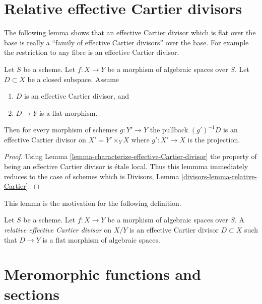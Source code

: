 








\section{Relative effective Cartier divisors}
\label{section-effective-Cartier-morphisms}

\noindent
The following lemma shows that an effective Cartier divisor which is
flat over the base is really a ``family of effective Cartier divisors''
over the base. For example the restriction to any fibre is an effective
Cartier divisor.

\begin{lemma}
\label{lemma-relative-Cartier}
Let $S$ be a scheme. Let $f : X \to Y$ be a morphism of
algebraic spaces over $S$. Let $D \subset X$ be a closed subspace.
Assume
\begin{enumerate}
\item $D$ is an effective Cartier divisor, and
\item $D \to Y$ is a flat morphism.
\end{enumerate}
Then for every morphism of schemes $g : Y' \to Y$ the pullback
$(g')^{-1}D$ is an effective Cartier divisor on $X' = Y' \times_Y X$
where $g' : X' \to X$ is the projection.
\end{lemma}

\begin{proof}
Using Lemma \ref{lemma-characterize-effective-Cartier-divisor}
the property of being an effective Cartier divisor is \'etale local.
Thus this lemmma immediately reduces to the case of schemes
which is Divisors, Lemma \ref{divisors-lemma-relative-Cartier}.
\end{proof}

\noindent
This lemma is the motivation for the following definition.

\begin{definition}
\label{definition-relative-effective-Cartier-divisor}
Let $S$ be a scheme.
Let $f : X \to Y$ be a morphism of algebraic spaces over $S$.
A {\it relative effective Cartier divisor} on $X/Y$ is an
effective Cartier divisor $D \subset X$ such that $D \to Y$
is a flat morphism of algebraic spaces.
\end{definition}








\section{Meromorphic functions and sections}
\label{section-meromorphic-functions}

